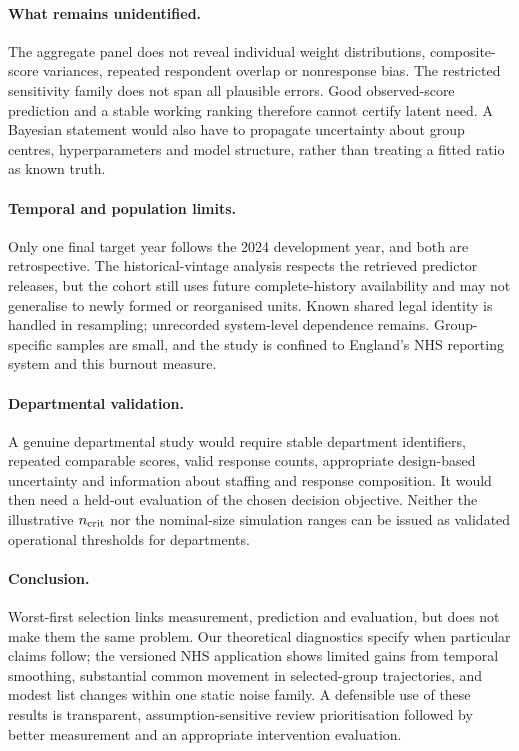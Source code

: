 \documentclass[11pt,letterpaper]{article}
\begin{document}
\paragraph{What remains unidentified.}
The aggregate panel does not reveal individual weight distributions, composite-score variances, repeated respondent overlap or nonresponse bias. The restricted sensitivity family does not span all plausible errors. Good observed-score prediction and a stable working ranking therefore cannot certify latent need. A Bayesian statement would also have to propagate uncertainty about group centres, hyperparameters and model structure, rather than treating a fitted ratio as known truth.

\paragraph{Temporal and population limits.}
Only one final target year follows the 2024 development year, and both are retrospective. The historical-vintage analysis respects the retrieved predictor releases, but the cohort still uses future complete-history availability and may not generalise to newly formed or reorganised units. Known shared legal identity is handled in resampling; unrecorded system-level dependence remains. Group-specific samples are small, and the study is confined to England's NHS reporting system and this burnout measure.

\paragraph{Departmental validation.}
A genuine departmental study would require stable department identifiers, repeated comparable scores, valid response counts, appropriate design-based uncertainty and information about staffing and response composition. It would then need a held-out evaluation of the chosen decision objective. Neither the illustrative $n_{\rm crit}$ nor the nominal-size simulation ranges can be issued as validated operational thresholds for departments.

\paragraph{Conclusion.}
Worst-first selection links measurement, prediction and evaluation, but does not make them the same problem. Our theoretical diagnostics specify when particular claims follow; the versioned NHS application shows limited gains from temporal smoothing, substantial common movement in selected-group trajectories, and modest list changes within one static noise family. A defensible use of these results is transparent, assumption-sensitive review prioritisation followed by better measurement and an appropriate intervention evaluation.
\end{document}
